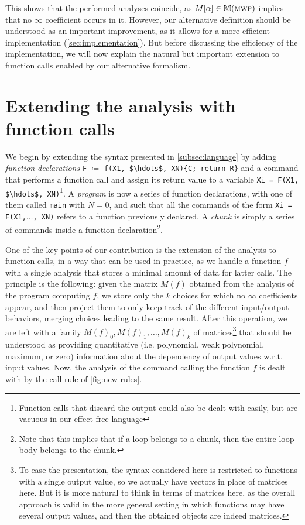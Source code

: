 \documentclass[runningheads]{llncs}
\makeatletter
\newcommand{\pr}{\lstinline[mathescape]}
\newcommand*{\ie}{i.e.\@\xspace}
\makeatother
\begin{document}
This shows that the performed analyses coincide, as \( M[\alpha] \in \mathbb{M}(\textsc{mwp})\) implies that no \(\infty\) coefficient occurs in it.
However, our alternative definition should be understood as an important improvement, as it allows for a more efficient implementation (\autoref{sec:implementation}).
But before discussing the efficiency of the implementation, we will now explain the natural but important extension to function calls enabled by our alternative formalism.

\section{Extending the analysis with function calls}
\label{composition}

We begin by extending the syntax presented in \autoref{subsec:language} by adding \emph{function declarations} \pr|F| \(\coloneqq\) \pr|f(X1, $\hdots$, XN){C; return R}| and a command that performs a function call and assign its return value to a variable \pr|Xi = F(X1, $\hdots$, XN)|\footnote{Function calls that discard the output could also be dealt with easily, but are vacuous in our effect-free language}.
A \emph{program} is now a series of function declarations, with one of them called \pr|main| with \(N = 0\), and such that all the commands of the form \pr|Xi = F(X1,|\(\hdots\)\pr|, XN)| refers to a function previously declared.
A \emph{chunk} is simply a series of commands inside a function declaration\footnote{Note that this implies that if a loop belongs to a chunk, then the entire loop body belongs to the chunk.}.

One of the key points of our contribution is the extension of the analysis to function calls, in a way that can be used in practice, as we handle a function \(f\) with a single analysis that stores a minimal amount of data for latter calls.
The principle is the following: given the matrix \(M(f)\) obtained from the analysis of the program computing \(f\), we store only the \(k\) choices for which no \(\infty\) coefficients appear, and then project them to only keep track of the different input/output behaviors, merging choices leading to the same result.
After this operation, we are left with a family \(M(f)_0, M(f)_1, \hdots,M(f)_k\) of matrices\footnote{To ease the presentation, the syntax considered here is restricted to functions with a single output value, so we actually have vectors in place of matrices here. But it is more natural to think in terms of matrices here, as the overall approach is valid in the more general setting in which functions may have several output values, and then the obtained objects are indeed matrices.} that should be understood as providing quantitative (\ie polynomial, weak polynomial, maximum, or zero) information about the dependency of output values w.r.t. input values. Now, the analysis of the command calling the function \(f\) is dealt with by the call rule of \autoref{fig:new-rules}.
\end{document}
